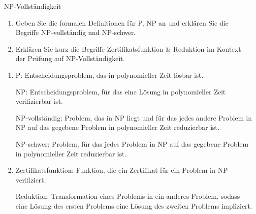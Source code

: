 \documentclass{article}
\begin{document}
\begin{exercise}{NP-Vollständigkeit}
  \begin{enumerate}
    \item Geben Sie die formalen Definitionen für P, NP an und erklären Sie die Begriffe NP-vollständig und NP-schwer.
    \item Erklären Sie kurz die Begriffe Zertifikatsfunktion \& Reduktion im Kontext der Prüfung auf NP-Vollständigkeit.
  \end{enumerate}

  \begin{solution}
    \begin{enumerate}
      \item P: Entscheidungsproblem, das in polynomieller Zeit lösbar ist.\par
            NP: Entscheidungsproblem, für das eine Lösung in polynomieller Zeit verifizierbar ist.\par
            NP-vollständig: Problem, das in NP liegt und für das jedes andere Problem in NP auf das gegebene Problem in polynomieller Zeit reduzierbar ist.\par
            NP-schwer: Problem, für das jedes Problem in NP auf das gegebene Problem in polynomieller Zeit reduzierbar ist.
      \item Zertifikatsfunktion: Funktion, die ein Zertifikat für ein Problem in NP verifiziert.\par
            Reduktion: Transformation eines Problems in ein anderes Problem, sodass eine Lösung des ersten Problems eine Lösung des zweiten Problems impliziert.
    \end{enumerate}
  \end{solution}
\end{exercise}
\end{document}
